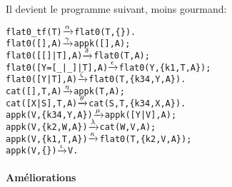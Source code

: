 Il devient le programme suivant, moins gourmand:
\begin{alltt}
flat0\_tf(T)          \(\smashedrightarrow{\alpha}\) flat0(T,\{\}).
flat0(         [],A) \(\smashedrightarrow{\gamma}\) appk([],A);
flat0(     [[]|T],A) \(\smashedrightarrow{\delta}\) flat0(T,A);
flat0([Y=[\_|\_]|T],A) \(\smashedrightarrow{\epsilon}\) flat0(Y,\{k1,T,A\});
flat0(      [Y|T],A) \(\smashedrightarrow{\zeta}\) flat0(T,\{k34,Y,A\}).
cat(   [],T,A)       \(\smashedrightarrow{\eta}\) appk(T,A);
cat([X|S],T,A)       \(\smashedrightarrow{\theta}\) cat(S,T,\{k34,X,A\}).
appk(V,\{k34,Y,A\})    \(\smashedrightarrow{\mu}\) appk([Y|V],A);
appk(V, \{k2,W,A\})    \(\smashedrightarrow{\lambda}\) cat(W,V,A);
appk(V, \{k1,T,A\})    \(\smashedrightarrow{\kappa}\) flat0(T,\{k2,V,A\});
appk(V,       \{\})    \(\smashedrightarrow{\iota}\) V.
\end{alltt}

\paragraph{Améliorations}
\label{par_fib_ameliorations}

